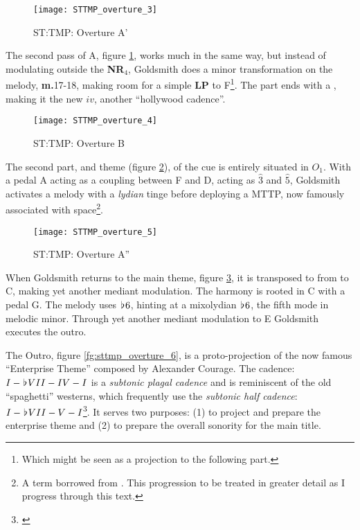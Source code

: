 \begin{figure}
\center
\texttt{[image: STTMP\_overture\_3]}
	\caption{ST:TMP: Overture A'}
	\label{fg:sttmp_overture_3}
\end{figure}
The second pass of A, figure \ref{fg:sttmp_overture_3}, works much in the same way, but instead of modulating outside the \textbf{NR\(_{4}\)}, Goldsmith does a minor transformation on the melody, \textbf{m.}17-18, making room for a simple \textbf{LP} to F\footnote{Which might be seen as a projection to the following part.}. The part ends with a \aissm, making it the new \(iv\), another ``hollywood cadence''. 

\begin{figure}
\center
\texttt{[image: STTMP\_overture\_4]}
	\caption{ST:TMP: Overture B}
	\label{fg:sttmp_overture_4}
\end{figure}
The second part, and theme (figure \ref{fg:sttmp_overture_4}), of the cue is entirely situated in \(O_{1}\). With a pedal A acting as a coupling between F and D, acting as \(\hat{3}\) and \(\hat{5}\), Goldsmith activates a melody with a \textit{lydian} tinge before deploying a \ac{MTTP}, now famously associated with space\footnote{A term borrowed from \textcite{murphy_major_2006}. This progression to be treated in greater detail as I progress through this text.}.


\begin{figure}
\center
\texttt{[image: STTMP\_overture\_5]}
	\caption{ST:TMP: Overture A''}
	\label{fg:sttmp_overture_5}
\end{figure}
When Goldsmith returns to the main theme, figure \ref{fg:sttmp_overture_5}, it is transposed to from \aflat to C, making yet another mediant modulation. The harmony is rooted in C with a pedal G. The melody uses \(\hspace*{0.18ex}\flat\hspace*{0.18ex}{6}\), hinting at a mixolydian \(\hspace*{0.18ex}\flat\hspace*{0.18ex}{6}\), the fifth mode in melodic minor. Through yet another mediant modulation to E Goldsmith executes the outro.


The Outro, figure \ref{fg:sttmp_overture_6}, is a proto-projection of the now famous ``Enterprise Theme'' composed by Alexander Courage. The cadence: \(I-{\hspace*{0.18ex}\flat\hspace*{0.18ex}}VII-IV-I\) is a \emph{subtonic plagal cadence} and is reminiscent of the old ``spaghetti'' westerns, which frequently use the \emph{subtonic half cadence}: \(I-{\hspace*{0.18ex}\flat\hspace*{0.18ex}}VII-V-I\)\footnote{\textcite{lehman_hollywood_2013}}. It serves two purposes: (1) to project and prepare the enterprise theme and (2) to prepare the overall sonority for the main title.

